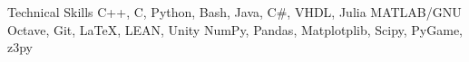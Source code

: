 \begin{rubric}{Technical Skills}
	\entry*[Programming] C++, C, Python, Bash, Java, C\#, VHDL, Julia
    \entry*[Software] MATLAB/GNU Octave, Git, \LaTeX, LEAN, Unity
    \entry*[Libraries] NumPy, Pandas, Matplotplib, Scipy, PyGame, z3py
\end{rubric}